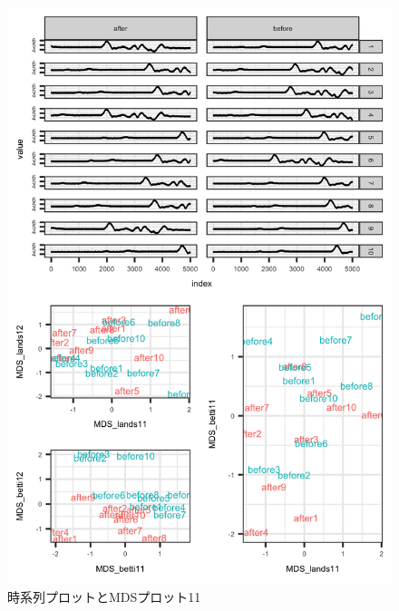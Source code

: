 \documentclass{jarticle}
\begin{document}
\begin{figure}[H]
	\begin{center}
		\includegraphics[width=15cm]{fig/MDS_plot11.png}
		\caption{時系列プロットとMDSプロット11}
		\label{fig:MDS_plot11}
	\end{center}
\end{figure}
\end{document}
